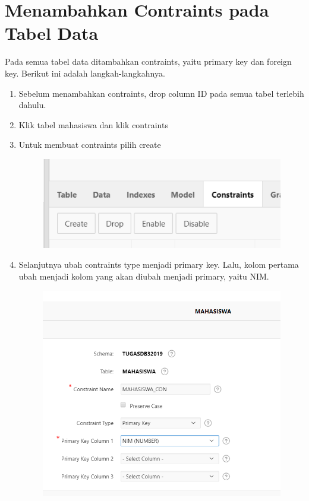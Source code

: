 \section{Menambahkan Contraints pada Tabel Data}
Pada semua tabel data ditambahkan contraints, yaitu primary key dan foreign key. Berikut ini adalah langkah-langkahnya.
\begin{enumerate}
    \item Sebelum menambahkan contraints, drop column ID pada semua tabel terlebih dahulu.
    \item Klik tabel mahasiswa dan klik contraints
    \item Untuk membuat contraints pilih create
    
\begin{figure}[!htbp]
    \centering
    \includegraphics[scale=0.5]{figure/create.png}
    \label{penanda}
\end{figure} 
    
    \item Selanjutnya ubah contraints type menjadi primary key. Lalu, kolom pertama ubah menjadi kolom yang akan diubah menjadi primary, yaitu NIM.
    
\begin{figure}[!htbp]
    \centering
    \includegraphics[scale=0.5]{figure/ct.png}
    \label{penanda}
\end{figure} 
    

\end{enumerate}
